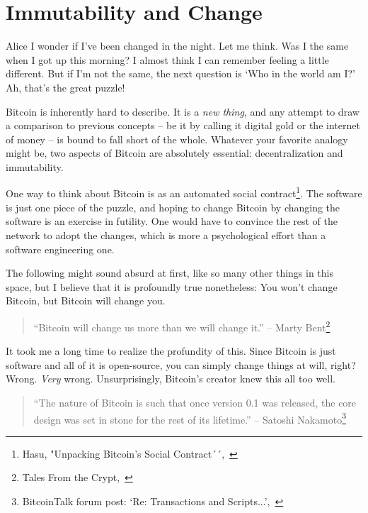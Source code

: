 \chapter{Immutability and Change}
\label{les:1}

\begin{chapquote}{Alice}
I wonder if I've been changed in the night. Let me think. Was I the same when I
got up this morning? I almost think I can remember feeling a little different.
But if I'm not the same, the next question is `Who in the world am I?' Ah,
that's the great puzzle!
\end{chapquote}

Bitcoin is inherently hard to describe. It is a \textit{new thing}, and any
attempt to draw a comparison to previous concepts -- be it by calling
it digital gold or the internet of money -- is bound to fall short of
the whole. Whatever your favorite analogy might be, two aspects of
Bitcoin are absolutely essential: decentralization and immutability.

One way to think about Bitcoin is as an automated social contract\footnote{Hasu,
"Unpacking Bitcoin's Social Contract´´,~\cite{social-contract}}. The software is
just one piece of the puzzle, and hoping to change Bitcoin by changing the
software is an exercise in futility. One would have to convince the rest of the
network to adopt the changes, which is more a psychological effort than a
software engineering one.

The following might sound absurd at first, like so many other things in
this space, but I believe that it is profoundly true nonetheless: You
won't change Bitcoin, but Bitcoin will change you.

\begin{quotation}
``Bitcoin will change us more than we will change it.''
\flushright -- Marty Bent\footnote{Tales From the Crypt,~\cite{tftc21}}
\end{quotation}

It took me a long time to realize the profundity of this. Since Bitcoin
is just software and all of it is open-source, you can simply change
things at will, right? Wrong. \textit{Very} wrong. Unsurprisingly, Bitcoin's
creator knew this all too well.

\begin{quotation}
``The nature of Bitcoin is such that once version 0.1 was released, the core
design was set in stone for the rest of its lifetime.''
\flushright -- Satoshi Nakamoto\footnote{BitcoinTalk forum post: `Re:
Transactions and Scripts...',~\cite{satoshi-set-in-stone}}
\end{quotation}

